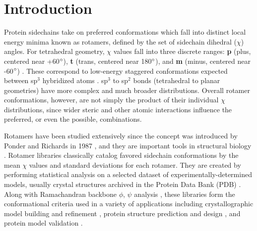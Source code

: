 \section{Introduction}
Protein sidechains take on preferred conformations which fall into distinct local energy minima known as rotamers, defined by the set of sidechain dihedral ($\chi$) angles. For tetrahedral geometry, $\chi$ values fall into three discrete ranges: \textbf{p} (plus, centered near +60$\degree$), \textbf{t} (trans, centered near 180$\degree$), and \textbf{m} (minus, centered near -60$\degree$) \cite{lovell2000penultimate}. These correspond to low-energy staggered conformations expected between sp$^{3}$ hybridized atoms \cite{Eyring1932}. sp$^{3}$ to sp$^{2}$ bonds (tetrahedral to planar geometries) have more complex and much broader distributions. Overall rotamer conformations, however, are not simply the product of their individual $\chi$ distributions, since wider steric and other atomic interactions influence the preferred, or even the possible, combinations.

Rotamers have been studied extensively since the concept was introduced by Ponder and Richards in 1987 \cite{Ponder1987}, and they are important tools in structural biology \cite{DunbrackJr2002431}. Rotamer libraries classically catalog favored sidechain conformations by the mean $\chi$ values and standard deviations for each rotamer. They are created by performing statistical analysis on a selected dataset of experimentally-determined models, usually crystal structures archived in the Protein Data Bank (PDB) \cite{Berman2000}. Along with Ramachandran backbone $\phi$, $\psi$ analysis \cite{RAMACHANDRAN1963,JSR_theplot_2013}, these libraries form the conformational criteria used in a variety of applications including crystallographic model building and refinement \cite{Emsley:ba5144, Adams:2010fk, Winn2011, Arendall2005}, protein structure prediction and design \cite{Bower1997, Kuhlman21112003, Gainza:2012}, and protein model validation \cite{Laskowski:gl0276, Chen:2010kx, Hooft1996}.

